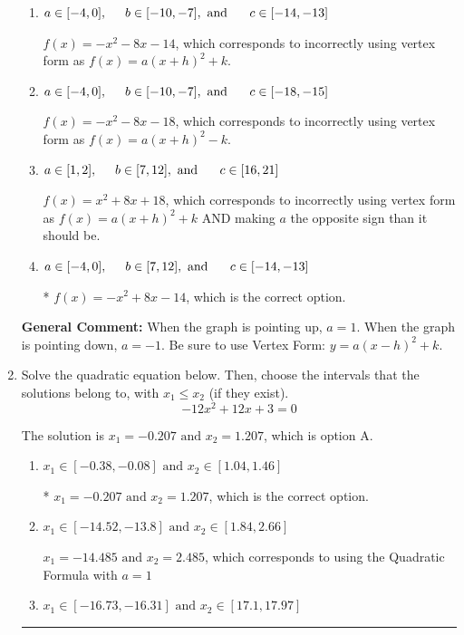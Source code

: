 \documentclass{extbook}[14pt]
\newcommand{\litem}[1]{\item #1

\rule{\textwidth}{0.4pt}}
\begin{document}
\begin{enumerate}
{\begin{enumerate}[label=\Alph*.]
$f(x)=x^{2} -8 x + 18$, which corresponds to making $a$ the opposite sign than it should be.
\item \( a \in [-4, 0], \hspace*{5mm} b \in [-10, -7], \text{ and } \hspace*{5mm} c \in [-14, -13] \)

$f(x)=-x^{2} -8 x -14$, which corresponds to incorrectly using vertex form as $f(x) = a(x+h)^2+k$.
\item \( a \in [-4, 0], \hspace*{5mm} b \in [-10, -7], \text{ and } \hspace*{5mm} c \in [-18, -15] \)

$f(x)=-x^{2} -8 x -18$, which corresponds to incorrectly using vertex form as $f(x) = a(x+h)^2 - k$.
\item \( a \in [1, 2], \hspace*{5mm} b \in [7, 12], \text{ and } \hspace*{5mm} c \in [16, 21] \)

$f(x)=x^{2} +8 x + 18$, which corresponds to incorrectly using vertex form as $f(x) = a(x+h)^2+k$ AND making $a$ the opposite sign than it should be.
\item \( a \in [-4, 0], \hspace*{5mm} b \in [7, 12], \text{ and } \hspace*{5mm} c \in [-14, -13] \)

* $f(x)=-x^{2} +8 x -14$, which is the correct option.
\end{enumerate}

\textbf{General Comment:} When the graph is pointing up, $a=1$. When the graph is pointing down, $a=-1$. Be sure to use Vertex Form: $y = a(x-h)^2+k$.
}
\litem{
Solve the quadratic equation below. Then, choose the intervals that the solutions belong to, with $x_1 \leq x_2$ (if they exist).
\[ -12x^{2} +12 x + 3 = 0 \]

The solution is \( x_1 = -0.207 \text{ and } x_2 = 1.207 \), which is option A.\begin{enumerate}[label=\Alph*.]
\item \( x_1 \in [-0.38, -0.08] \text{ and } x_2 \in [1.04, 1.46] \)

* $x_1 = -0.207 \text{ and } x_2 = 1.207$, which is the correct option.
\item \( x_1 \in [-14.52, -13.8] \text{ and } x_2 \in [1.84, 2.66] \)

 $x_1 = -14.485 \text{ and } x_2 = 2.485$, which corresponds to using the Quadratic Formula with $a=1$
\item \( x_1 \in [-16.73, -16.31] \text{ and } x_2 \in [17.1, 17.97] \)


\end{enumerate}}
\end{enumerate}
\end{document}
